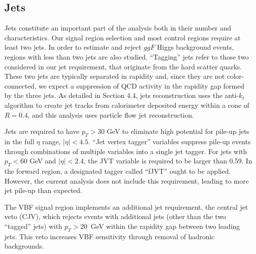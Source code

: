 \begin{table}[h]
  \centering
  \caption{Muon selections}
  \label{tab:MuonSelection}
\end{table}


\subsection{Jets}

Jets constitute an important part of the analysis both in their number and characteristics. Our signal region selection and most control regions require at least two jets. In order to estimate and reject $ggF$ Higgs background events, regions with less than two jets are also studied. ``Tagging'' jets refer to those two considered in our jet requirement, that originate from the hard scatter quarks. These two jets are typically separated in rapidity and, since they are not color-connected, we expect a suppression of QCD activity in the rapidity gap formed by the three jets. As detailed in Section 4.4, jets reconstruction uses the anti-$k_t$ algorithm to create jet tracks from calorimeter deposited energy within a cone of $R = 0.4$, and this analysis uses particle flow jet reconstruction.   

Jets are required to have $p_T > 30$ GeV to eliminate high potential for pile-up jets in the full $\eta$ range, $|\eta| < 4.5$. ``Jet vertex tagger'' variables suppress pile-up events through combinations of multiple variables into a single jet tagger. For jets with $p_T < 60$ GeV and $|\eta| < 2.4$, the JVT variable is required to be larger than 0.59. In the forward region, a designated tagger called ``fJVT'' ought to be applied. However, the current analysis does not include this requirement, leading to more jet pile-up than expected. 

The VBF signal region implements an additional jet requirement, the central jet veto (CJV), which rejects events with additional jets (other than the two ``tagged'' jets) with $p_T>20$~GeV within the rapidity gap between two leading jets. This veto increases VBF sensitivity through removal of hadronic backgrounds.
